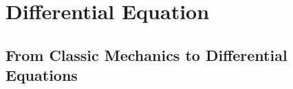 \documentclass[12pt,oneside]{book}
\begin{document}
    \tableofcontents
    \chapter{Differential Equation}
    \section{From Classic Mechanics to Differential Equations}
    
\end{document}
